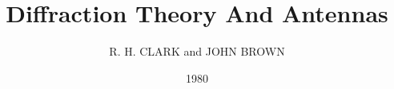 \documentclass[a4paper,12pt]{book}
\begin{document}
\author{R. H. CLARK and JOHN BROWN}
\title{Diffraction Theory And Antennas}
\date{1980}

\frontmatter
\maketitle
\tableofcontents

\mainmatter










\backmatter
\end{document}

